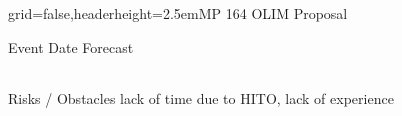 \documentclass[english]{kiesgrube}
\begin{document}
\begin{poster}{grid=false,headerheight=2.5em}{}{MP 164 OLIM Proposal}{}{}
\begin{posterbox}[name=event,below=progress,]{Event Date Forecast}
\begin{tabulary}{\textwidth}{lL}
\end{tabulary}
\end{posterbox}
\begin{posterbox}[name=event,below=event]{Risks / Obstacles}
lack of time due to HITO, lack of experience
\end{posterbox}
\footer{}
\end{poster}

\newpage
\end{document}
